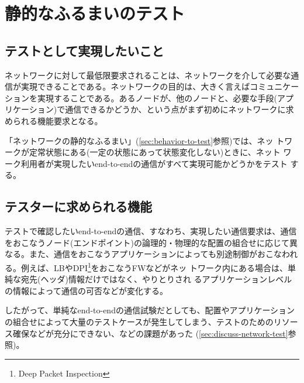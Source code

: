 
 \section{静的なふるまいのテスト}

  \subsection{テストとして実現したいこと}
ネットワークに対して最低限要求されることは、ネットワークを介して必要な通
信が実現できることである。ネットワークの目的は、大きく言えばコミュニケー
ションを実現することである。あるノードが、他のノードと、必要な手段(アプ
リケーション)で通信できるかどうか、という点がまず初めにネットワークに求
められる機能要求となる。

「ネットワークの静的なふるまい」(\ref{sec:behavior-to-test}参照)では、ネッ
トワークが定常状態にある(一定の状態にあって状態変化しない)ときに、ネット
ワーク利用者が実現したいend-to-endの通信がすべて実現可能かどうかをテスト
する。

  \subsection{テスターに求められる機能}

テストで確認したいend-to-endの通信、すなわち、実現したい通信要求は、通信
をおこなうノード(エンドポイント)の論理的・物理的な配置の組合せに応じて異
なる。また、通信をおこなうアプリケーションによっても別途制御がおこなわれ
る。例えば、LBやDPI\footnote{Deep Packet Inspection}をおこなうFWなどがネッ
トワーク内にある場合は、単純な宛先(ヘッダ)情報だけではなく、やりとりされ
るアプリケーションレベルの情報によって通信の可否などが変化する。

したがって、単純なend-to-endの通信試験だとしても、配置やアプリケーション
の組合せによって大量のテストケースが発生してしまう、テストのためのリソー
ス確保などが充分にできない、などの課題があった
(\ref{sec:discuss-network-test}参照)。


